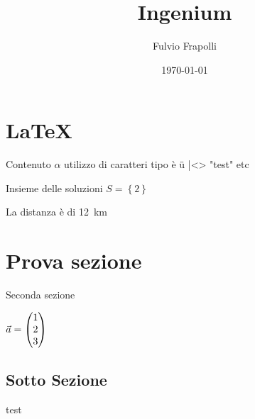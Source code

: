 \documentclass[]{article}
\title{Ingenium}
\author{Fulvio Frapolli}
\date{\today}
\begin{document}
\maketitle

\tableofcontents
\newpage



\section{\LaTeX}

Contenuto $\alpha$ utilizzo di caratteri tipo è ü |<> "test"
 etc



 Insieme delle soluzioni $S=\left\lbrace 2 \right\rbrace$

 La distanza è di \qty{12}{\km}    

\section{Prova sezione}

Seconda sezione

$\vec{a}=\vvec{1,2,3}$

\subsection{Sotto Sezione}

test
\end{document}
